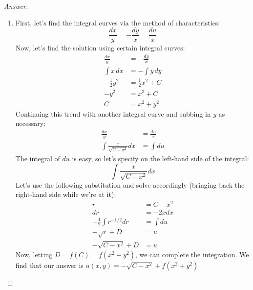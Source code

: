 \documentclass{article}
\theoremstyle{definition}
\renewcommand\qedsymbol{$\blacksquare$}
\newenvironment{ans}{\begin{proof}[Answer]\renewcommand{\qedsymbol}{}}{\end{proof}}
\begin{document}
	\begin{ans}
		\begin{enumerate}[resume*=answers]
			\item First, let's find the integral curves via the method of characteristics:
                $$\frac{dx}{y} = -\frac{dy}{x} = \frac{du}{x}$$
            Now, let's find the solution using certain integral curves:
            \begin{align*}
                \frac{dx}{y} &= -\frac{dy}{x}\\
                \int x\,dx &= -\int y\,dy\\
                -\frac{1}{2}y^2 &= \frac{1}{2}x^2 + C\\
                -y^2 &= x^2 + C\\
                C &= x^2 + y^2
            \end{align*}
            Continuing this trend with another integral curve and subbing in $y$ as necessary:
            \begin{align*}
                \frac{dx}{y} &= \frac{du}{x}\\
                \int \frac{x}{\sqrt{C-x^2}} dx &= \int du
            \end{align*}
            The integral of $du$ is easy, so let's specify on the left-hand side of the integral:
                $$\int \frac{x}{\sqrt{C-x^2}} dx$$
			Let's use the following substitution and solve accordingly (bringing back the right-hand side while we're at it):
            \begin{align*}
                r &= C-x^2\\
                dr &= -2x dx\\
                -\frac{1}{2}\int r^{-1/2} dr &= \int du\\
                -\sqrt{r} + D &= u\\
                -\sqrt{C-x^2} + D &= u
            \end{align*}
            Now, letting $D = f(C) = f(x^2 + y^2)$, we can complete the integration. We find that our answer is $\boxed{u(x, y) = -\sqrt{C-x^2} + f(x^2 + y^2)}$\\
            

\end{enumerate}
\end{ans}
\end{document}
